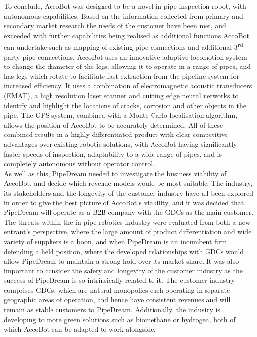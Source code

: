 \documentclass[11pt]{article}		%
\begin{document}
        To conclude, AccoBot was designed to be a novel in-pipe inspection robot, with autonomous capabilities.
        Based on the information collected from primary and secondary market research the needs of the customer have been met, and exceeded with further capabilities being realised as additional functions AccoBot can undertake such as mapping of existing pipe connections and additional 3\textsuperscript{rd} party pipe connections.
        AccoBot uses an innovative adaptive locomotion system to change the diameter of the legs, allowing it to operate in a range of pipes, and has legs which rotate to facilitate fast extraction from the pipeline system for increased efficiency.
        It uses a combination of electromagnetic acoustic transducers (EMAT), a high resolution laser scanner and cutting edge neural networks to identify and highlight the locations of cracks, corrosion and other objects in the pipe.
        The GPS system, combined with a Monte-Carlo localisation algorithm, allows the position of AccoBot to be accurately determined.
        All of these combined results in a highly differentiated product with clear competitive advantages over existing robotic solutions, with AccoBot having significantly faster speeds of inspection, adaptability to a wide range of pipes, and is completely autonomous without operator control. 
        \\ 
        \hspace*{2ex}As well as this, PipeDream needed to investigate the business viability of AccoBot, and decide which revenue models would be most suitable.
        The industry, its stakeholders and the longevity of the customer industry have all been explored in order to give the best picture of AccoBot's viability, and it was decided that PipeDream will operate as a B2B company with the GDCs as the main customer.
        The threats within the in-pipe robotics industry were evaluated from both a new entrant's perspective, where the large amount of product differentiation and wide variety of suppliers is a boon, and when PipeDream is an incumbent firm defending a held position, where the developed relationships with GDCs would allow PipeDream to maintain a strong hold over its market share.
        It was also important to consider the safety and longevity of the customer industry as the success of PipeDream is so intrinsically related to it.
        The customer industry comprises GDCs, which are natural monopolies each operating in separate geographic areas of operation, and hence have consistent revenues and will remain as stable customers to PipeDream. Additionally, the industry is developing to more green solutions such as biomethane or hydrogen, both of which AccoBot can be adapted to work alongside.
\end{document}
